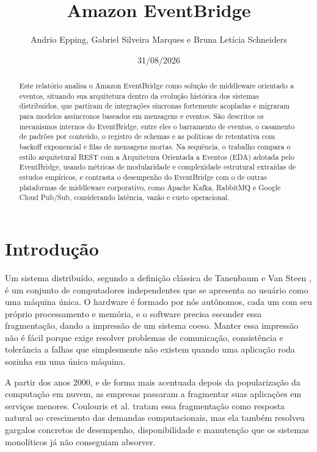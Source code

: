 \documentclass[12pt, a4paper]{article}
\title{\textbf{Amazon EventBridge}}
\author{Andrio Epping, Gabriel Silveira Marques e Bruna Letícia Schneiders}
\date{31/08/2026}
\begin{document}
\maketitle

\begin{abstract}
Este relatório analisa o Amazon EventBridge como solução de middleware orientado a eventos, situando sua arquitetura dentro da evolução histórica dos sistemas distribuídos, que partiram de integrações síncronas fortemente acopladas e migraram para modelos assíncronos baseados em mensagens e eventos. São descritos os mecanismos internos do EventBridge, entre eles o barramento de eventos, o casamento de padrões por conteúdo, o registro de schemas e as políticas de retentativa com backoff exponencial e filas de mensagens mortas. Na sequência, o trabalho compara o estilo arquitetural REST com a Arquitetura Orientada a Eventos (EDA) adotada pelo EventBridge, usando métricas de modularidade e complexidade estrutural extraídas de estudos empíricos, e contrasta o desempenho do EventBridge com o de outras plataformas de middleware corporativo, como Apache Kafka, RabbitMQ e Google Cloud Pub/Sub, considerando latência, vazão e custo operacional.
\end{abstract}

\tableofcontents
\newpage

\section{Introdução}

Um sistema distribuído, segundo a definição clássica de Tanenbaum e Van Steen \cite{tanenbaum2002}, é um conjunto de computadores independentes que se apresenta ao usuário como uma máquina única. O hardware é formado por nós autônomos, cada um com seu próprio processamento e memória, e o software precisa esconder essa fragmentação, dando a impressão de um sistema coeso. Manter essa impressão não é fácil porque exige resolver problemas de comunicação, consistência e tolerância a falhas que simplesmente não existem quando uma aplicação roda sozinha em uma única máquina.

A partir dos anos 2000, e de forma mais acentuada depois da popularização da computação em nuvem, as empresas passaram a fragmentar suas aplicações em serviços menores. Coulouris et al. \cite{coulouris2012} tratam essa fragmentação como resposta natural ao crescimento das demandas computacionais, mas ela também resolveu gargalos concretos de desempenho, disponibilidade e manutenção que os sistemas monolíticos já não conseguiam absorver.
\end{document}
